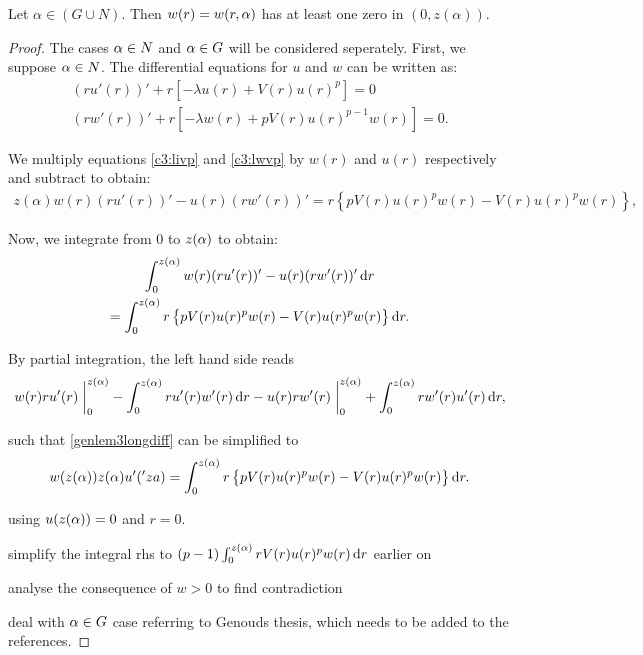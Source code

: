 \begin{lemma}\label{genlem3}
Let $\alpha\in (G\cup N).$ Then $w(r)=w(r,\alpha)$ has at least one zero in $(0,z(\alpha))$.
\end{lemma}
\begin{proof}
The cases $\alpha\in N$ and $\alpha\in G$ will be considered seperately. First, we
suppose $\alpha\in N$. The differential equations for $u$ and $w$ can be written as:
\begin{gather}
\label{c3:livp}  (ru'(r))'+r\left[-\lambda u(r)+V(r)u(r)^p\right]=0\\
\label{c3:lwvp}  (rw'(r))'+r\left[-\lambda w(r)+pV(r)u(r)^{p-1}w(r)\right]=0.
\end{gather}


We multiply equations \eqref{c3:livp} and \eqref{c3:lwvp} by $w(r)$ and $u(r)$
respectively and subtract to obtain:
\begin{gather*}
	z(\alpha)w(r)(ru'(r))'-u(r)(rw'(r))'=r\left\{pV(r)u(r)^pw(r)-V(r)u(r)^pw(r)\right\},
\end{gather*}

Now, we integrate from $0$ to $z(\alpha)$ to obtain: 
\begin{multline} \label{genlem3longdiff}
  \int_0^{z(\alpha)}w(r)(ru'(r))'-u(r)(rw'(r))'\mathop{}\!\mathrm{d} r\\
  = \int_0^{z(\alpha)}r\left\{pV(r)u(r)^pw(r)-V(r)u(r)^pw(r)\right\}\mathop{}\!\mathrm{d} r.
\end{multline}

By partial integration, the left hand side reads
\[
w(r) r u'(r) \at_0^{\za} - \int_0^{\za} r u'(r) w'(r) \diff r
- u(r) r w'(r) \at_0^{\za} + \int_0^{\za} r w'(r) u'(r) \diff r,
\]

such that \eqref{genlem3longdiff} can be simplified to
\[
w(z(\alpha)) z(\alpha) u'('za) = \int_0^{z(\alpha)}
r \left\{ p V(r) u(r)^p w(r) - V(r) u(r)^p w(r) \right\} \mathop{}\!\mathrm{d} r.
\]

using $u(z(\alpha)) = 0$ and $r = 0$.

{\red simplify the integral rhs to $(p-1) \int_0^{z(\alpha)} r V(r) u(r)^p w(r) \mathop{}\!\mathrm{d}
r$ earlier on

analyse the consequence of $w > 0$ to find contradiction}

{\red deal with $\alpha \in G$ case referring to Genouds thesis, which needs to be
added to the references.

}
\end{proof}
